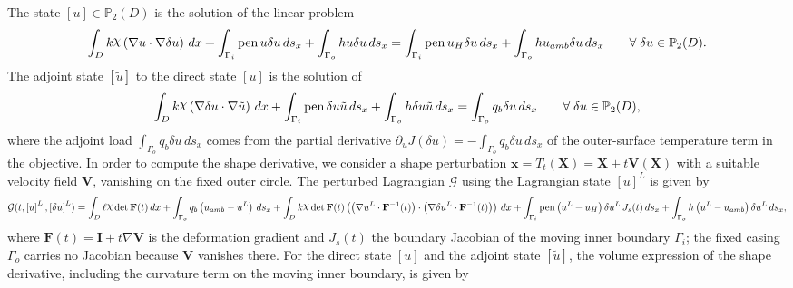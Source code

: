 \documentclass[preview]{standalone}
\let\oldcdot\cdot
\let\cdot\oldcdot
\begin{document}
The state $\left[ u\right] \in \mathbb P_{2}(D)$ is the solution of the linear problem
\begin{dmath*}
\int_{D} k \raisebox{\depth}{$\chi$} \left(  \nabla u  \cdot  \nabla \delta u  \right) \,dx + \int_{\Gamma_i} \operatorname{pen} u \delta u \,ds_x + \int_{\Gamma_o} h u \delta u \,ds_x = \int_{\Gamma_i} \operatorname{pen} u_{H} \delta u \,ds_x + \int_{\Gamma_o} h u_{amb} \delta u \,ds_x \qquad \forall\; {\delta u\in \mathbb P_{2}(D)} .
\end{dmath*}
The adjoint state $\left[ \tilde u\right]$ to the direct state $\left[ u\right]$ is the solution of
\begin{dmath*}
\int_{D} k \raisebox{\depth}{$\chi$} \left(  \nabla \delta u  \cdot  \nabla \tilde u  \right) \,dx + \int_{\Gamma_i} \operatorname{pen} \delta u \tilde u \,ds_x + \int_{\Gamma_o} h \delta u \tilde u \,ds_x = \int_{\Gamma_o} q_b \delta u \,ds_x \qquad \forall\; {\delta u\in \mathbb P_{2}(D)} ,
\end{dmath*}
where the adjoint load $\int_{\Gamma_o} q_b \delta u \,ds_x$ comes from the partial derivative $\partial_{u} J(\delta u) = - \int_{\Gamma_o} q_b \delta u \,ds_x$ of the outer-surface temperature term in the objective.
In order to compute the shape derivative, we consider a shape perturbation $\mathbf x = T_t(\mathbf X) = \mathbf X + t \mathbf  V(\mathbf X)$ with a suitable velocity field $\mathbf V$, vanishing on the fixed outer circle.  The perturbed Lagrangian $\mathcal G$ using the Lagrangian state $\left[ u\right]^{L}$ is given by
\begin{dmath*}
\mathcal G(t,\left[ u\right]^{L},\left[ \delta u\right]^{L}) = \int_{D} \ell \raisebox{\depth}{$\chi$}  \operatorname{det}\mathbf F( t )  \,dx + \int_{\Gamma_o} q_b \left( u_{amb} - u^{L}\right) \,ds_x +  \int_{D} k \raisebox{\depth}{$\chi$}  \operatorname{det}\mathbf F( t )  \left( \left(  \nabla u^{L} \cdot  \mathbf F^{-1}(t) \right) \cdot \left(  \nabla \delta u^{L} \cdot  \mathbf F^{-1}(t) \right) \right) \,dx + \int_{\Gamma_i} \operatorname{pen} \left( u^{L} - u_{H}\right) \delta u^{L} \,J_{s}(t) \,ds_x + \int_{\Gamma_o} h \left( u^{L} - u_{amb}\right) \delta u^{L} \,ds_x ,
\end{dmath*}
where $\mathbf F(t) = \mathbf I + t \nabla \mathbf V$ is the deformation gradient and $J_{s}(t)$ the boundary Jacobian of the moving inner boundary $\Gamma_i$; the fixed casing $\Gamma_o$ carries no Jacobian because $\mathbf V$ vanishes there.
For the direct state $\left[ u\right]$ and the adjoint state $\left[ \tilde u\right]$, the volume expression of the shape derivative, including the curvature term on the moving inner boundary, is given by
\end{document}
